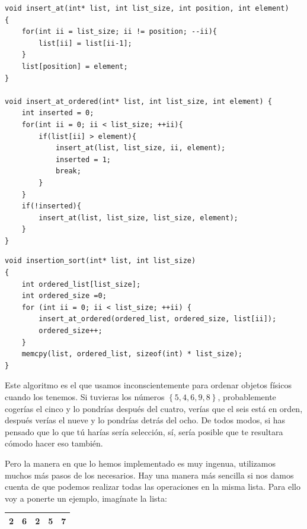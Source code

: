 \documentclass[a4paper]{article}
\begin{document}
\noindent
\begin{minipage}[H]{\linewidth}
\mbox{}
\begin{lstlisting}[style=C,
caption={Algoritmos auxiliares al de inserción},
label={lst:insertionAuxiliar}]
void insert_at(int* list, int list_size, int position, int element)
{
    for(int ii = list_size; ii != position; --ii){
        list[ii] = list[ii-1];
    }
    list[position] = element;
}

void insert_at_ordered(int* list, int list_size, int element) {
    int inserted = 0;
    for(int ii = 0; ii < list_size; ++ii){
        if(list[ii] > element){
            insert_at(list, list_size, ii, element);
            inserted = 1;
            break;
        }
    }
    if(!inserted){
        insert_at(list, list_size, list_size, element);
    }
}
\end{lstlisting}
\end{minipage}


\noindent
\begin{minipage}[H]{\linewidth}
\mbox{}
\begin{lstlisting}[style=C,
caption={Algoritmo de inserción},
label={lst:insertionSort}]
void insertion_sort(int* list, int list_size)
{
    int ordered_list[list_size];
    int ordered_size =0;
    for (int ii = 0; ii < list_size; ++ii) {
        insert_at_ordered(ordered_list, ordered_size, list[ii]);
        ordered_size++;
    }
    memcpy(list, ordered_list, sizeof(int) * list_size);
}
\end{lstlisting}
\end{minipage}

Este algoritmo es el que usamos inconscientemente para ordenar objetos físicos
cuando los tenemos. Si tuvieras los números $\left\{5,4,6,9,8\right\}$,
probablemente cogerías el cinco y lo pondrías después del cuatro, verías que el
seis está en orden, después verías el nueve y lo pondrías detrás del ocho.
De todos modos, si has pensado que lo que tú harías sería selección, sí, sería
posible que te resultara cómodo hacer eso también.

Pero la manera en que lo hemos implementado es muy ingenua, utilizamos muchos
más pasos de los necesarios. Hay una manera más sencilla si nos damos cuenta
de que podemos realizar todas las operaciones en la misma lista. Para ello
voy a ponerte un ejemplo, imagínate la lista:
\begin{tabular}{|c|c|c|c|c|}
\hline
\textbf{2}&\textbf{6}&2&5&7\\\hline
\end{tabular}
\end{document}
